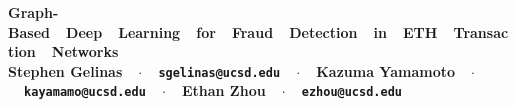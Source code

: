 \documentclass[article,36pt,extrafontsizes,oneside,openany,oldfontcommands]{memoir}
\begin{document}
\begin{topbox}
  \color{titletextcol}
  \vspace{0.8in}
  \bfseries
  \fontsize{100pt}{100pt}\selectfont
  {Graph-Based~~Deep~~Learning~~for~~Fraud~~Detection~~in~~ETH~~Transaction~~Networks}\\[0.5in]  %
  \color{authortextcol} 
  \mdseries
  \fontsize{40pt}{40pt}\selectfont
  {Stephen Gelinas~~$\cdot$~~\texttt{sgelinas@ucsd.edu}~~$\cdot$~~Kazuma Yamamoto~~$\cdot$~~\texttt{kayamamo@ucsd.edu}~~$\cdot$~~Ethan Zhou~~$\cdot$~~\texttt{ezhou@ucsd.edu}} 
  \vspace{0.6in}
\end{topbox}




\fontsize{40pt}{40pt}\selectfont
\end{document}

